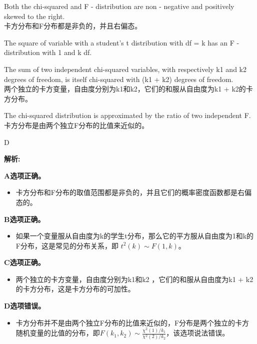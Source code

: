 \documentclass{article}
\newenvironment{explanation}
{\textbf{解析:}\par}
{\par}
\begin{document}
    \begin{choices}
        \item Both the chi-squared and F - distribution are non - negative and positively skewed to the right.\\
        卡方分布和F分布都是非负的，并且右偏态。
        \item The square of variable with a student’s t distribution with df = k has an F - distribution with 1 and k df.
        \item The sum of two independent chi-squared variables, with respectively k1 and k2 degrees of freedom, is itself chi-squared with (k1 + k2) degrees of freedom.\\
        两个独立的卡方变量，自由度分别为k1和k2，它们的和服从自由度为k1 + k2的卡方分布。
        \item The chi-squared distribution is approximated by the ratio of two independent F.\\
        卡方分布是由两个独立F分布的比值来近似的。
    \end{choices}
    
    \begin{correctanswer}
    D
    \end{correctanswer}
    
    \begin{explanation}
    \textbf{A选项正确。}
    \begin{itemize}
    \item 卡方分布和F分布的取值范围都是非负的，并且它们的概率密度函数都是右偏态的。
    \end{itemize}
    \textbf{B选项正确。}
    \begin{itemize}
    \item 如果一个变量服从自由度为k的学生t分布，那么它的平方服从自由度为1和k的F分布，这是常见的分布关系，即 $t^{2}(k)\sim F(1,k)$。
    \end{itemize}
    \textbf{C选项正确。}
    \begin{itemize}
    \item 两个独立的卡方变量，自由度分别为k1和k2 ，它们的和服从自由度为k1 + k2的卡方分布，这是卡方分布的可加性。
    \end{itemize}
    \textbf{D选项错误。}
    \begin{itemize}
    \item 卡方分布并不是由两个独立F分布的比值来近似的，F分布是两个独立的卡方随机变量的比值的分布，即$F(k_1, k_2) \sim \frac{\chi^2(1)/k_1}{\chi^2(2)/k_2}$，该选项说法错误。
    \end{itemize}
    \end{explanation}
    
\end{document}
